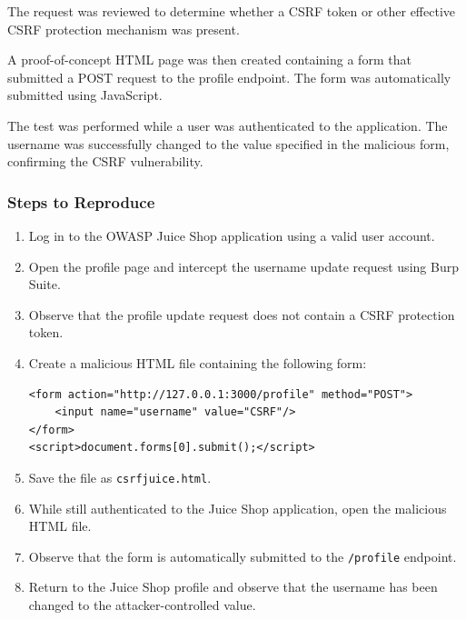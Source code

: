 The request was reviewed to determine whether a CSRF token or other
effective CSRF protection mechanism was present.

A proof-of-concept HTML page was then created containing a form that
submitted a POST request to the profile endpoint. The form was
automatically submitted using JavaScript.

The test was performed while a user was authenticated to the
application. The username was successfully changed to the value
specified in the malicious form, confirming the CSRF vulnerability.

\subsubsection*{Steps to Reproduce}

\begin{enumerate}

    \item Log in to the OWASP Juice Shop application using a valid
    user account.

    \item Open the profile page and intercept the username update
    request using Burp Suite.

    \item Observe that the profile update request does not contain a
    CSRF protection token.

    \item Create a malicious HTML file containing the following form:

    \begin{lstlisting}
<form action="http://127.0.0.1:3000/profile" method="POST">
    <input name="username" value="CSRF"/>
</form>
<script>document.forms[0].submit();</script>
    \end{lstlisting}

    \item Save the file as \texttt{csrfjuice.html}.

    \item While still authenticated to the Juice Shop application,
    open the malicious HTML file.

    \item Observe that the form is automatically submitted to the
    \texttt{/profile} endpoint.

    \item Return to the Juice Shop profile and observe that the
    username has been changed to the attacker-controlled value.

\end{enumerate}

